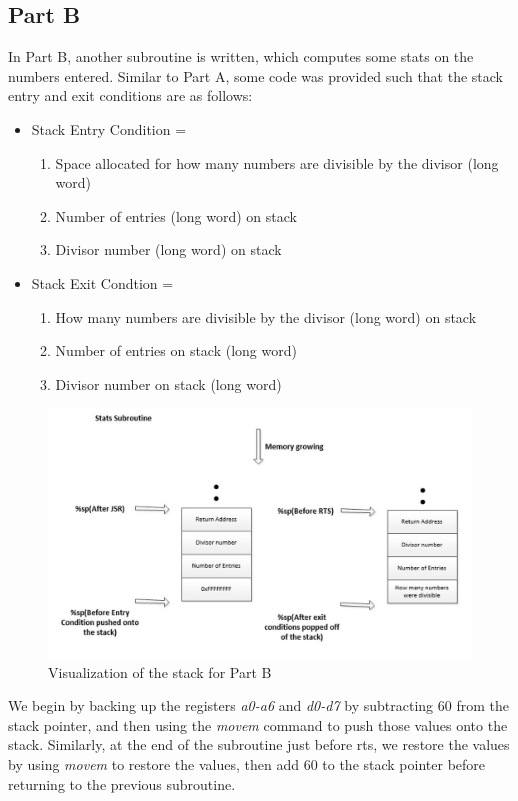 \documentclass[letterpaper]{article}
\begin{document}
  \subsection{Part B}
    In Part B, another subroutine is written, which computes some stats
    on the numbers entered. Similar to Part A, some code was provided
    such that the stack entry and exit conditions are as follows:

    \begin{itemize}
      \item Stack Entry Condition =
        \begin{enumerate}
          \item Space allocated for how many numbers are divisible by the divisor (long word)
          \item Number of entries (long word) on stack
          \item Divisor number (long word) on stack
        \end{enumerate}
      \item Stack Exit Condtion =
        \begin{enumerate}
          \item How many numbers are divisible by the divisor (long word) on stack
          \item Number of entries on stack (long word)
          \item Divisor number on stack (long word)
        \end{enumerate}
    \end{itemize}

    \begin{figure}[h!]
      \centering
      \includegraphics[width=.8\textwidth]{designb.jpg}
      \caption{Visualization of the stack for Part B}
    \end{figure}

    We begin by backing up the registers \textit{a0-a6} and \textit{d0-d7} by
    subtracting 60 from the stack pointer, and then using the \textit{movem}
    command to push those values onto the stack. Similarly, at the end of the
    subroutine just before rts, we restore the values by using \textit{movem} to restore the values,
    then add 60 to the stack pointer before returning to the previous subroutine.
\end{document}
